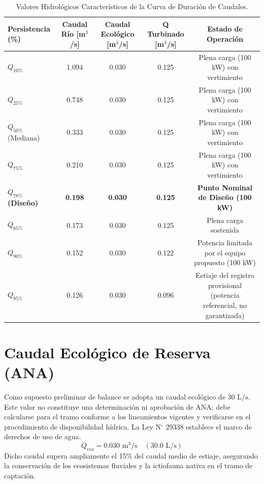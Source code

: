 \documentclass[11pt,a4paper]{report}
\begin{document}
\begin{table}[H]
\centering
\small
\begin{tabular}{lcccc}
\toprule
\textbf{Persistencia (\%)} & \textbf{Caudal Río [m$^3$/s]} & \textbf{Caudal Ecológico [m$^3$/s]} & \textbf{Q Turbinado [m$^3$/s]} & \textbf{Estado de Operación} \\
\midrule
$Q_{10\%}$ & 1.094 & 0.030 & 0.125 & Plena carga (100 kW) con vertimiento \\
$Q_{25\%}$ & 0.748 & 0.030 & 0.125 & Plena carga (100 kW) con vertimiento \\
$Q_{50\%}$ (Mediana) & 0.333 & 0.030 & 0.125 & Plena carga (100 kW) con vertimiento \\
$Q_{75\%}$ & 0.210 & 0.030 & 0.125 & Plena carga (100 kW) con vertimiento \\
\textbf{$Q_{78\%}$ (Diseño)} & \textbf{0.198} & \textbf{0.030} & \textbf{0.125} & \textbf{Punto Nominal de Diseño (100 kW)} \\
$Q_{85\%}$ & 0.173 & 0.030 & 0.125 & Plena carga sostenida \\
$Q_{90\%}$ & 0.152 & 0.030 & 0.122 & Potencia limitada por el equipo propuesto (100 kW) \\
$Q_{95\%}$ & 0.126 & 0.030 & 0.096 & Estiaje del registro provisional (potencia referencial, no garantizada) \\
\bottomrule
\end{tabular}
\caption{Valores Hidrológicos Característicos de la Curva de Duración de Caudales.}
\label{tab:cdc_valores}
\end{table}

\section{Caudal Ecológico de Reserva (ANA)}
Como supuesto preliminar de balance se adopta un caudal ecológico de $30\text{ L/s}$. Este valor no constituye una determinación ni aprobación de ANA; debe calcularse para el tramo conforme a los lineamientos vigentes y verificarse en el procedimiento de disponibilidad hídrica. La Ley N$^\circ$ 29338 establece el marco de derechos de uso de agua.
\begin{equation}
Q_{eco} = 0.030\text{ m}^3/\text{s} \quad (30.0\text{ L/s})
\end{equation}
Dicho caudal supera ampliamente el 15\% del caudal medio de estiaje, asegurando la conservación de los ecosistemas fluviales y la ictiofauna nativa en el tramo de captación.
\end{document}

